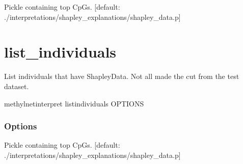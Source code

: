 \documentclass[letterpaper,10pt,english]{sphinxmanual}
\begin{document}
\begin{fulllineitems}
\label{\detokenize{index:cmdoption-methylnet-interpret-list-classes-s}}
Pickle containing top CpGs.  {[}default: ./interpretations/shapley\_explanations/shapley\_data.p{]}

\end{fulllineitems}



\section{list\_individuals}
\label{\detokenize{index:methylnet-interpret-list-individuals}}
List individuals that have ShapleyData. Not all made the cut from the test dataset.

\begin{sphinxVerbatim}[commandchars=\\\{\}]
methylnet\PYGZhy{}interpret list\PYGZus{}individuals \PYG{o}{[}OPTIONS\PYG{o}{]}
\end{sphinxVerbatim}
\subsubsection*{Options}

\begin{fulllineitems}
\label{\detokenize{index:cmdoption-methylnet-interpret-list-individuals-s}}
Pickle containing top CpGs.  {[}default: ./interpretations/shapley\_explanations/shapley\_data.p{]}

\end{fulllineitems}
\end{document}
